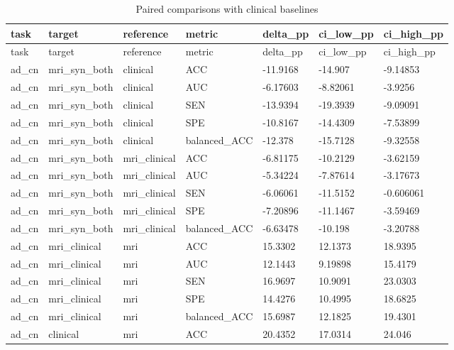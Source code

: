\begin{landscape}
\begingroup
\footnotesize
\setlength{\tabcolsep}{4pt}
\begin{longtable}{lllllll}
\caption{Paired comparisons with clinical baselines}\label{tab:classification_clinical_comparisons}\\
\toprule
task & target & reference & metric & delta\_pp & ci\_low\_pp & ci\_high\_pp \\
\midrule
\endfirsthead
\toprule
task & target & reference & metric & delta\_pp & ci\_low\_pp & ci\_high\_pp \\
\midrule
\endhead
\bottomrule
\endfoot
ad\_cn & mri\_syn\_both & clinical & ACC & -11.9168 & -14.907 & -9.14853 \\
ad\_cn & mri\_syn\_both & clinical & AUC & -6.17603 & -8.82061 & -3.9256 \\
ad\_cn & mri\_syn\_both & clinical & SEN & -13.9394 & -19.3939 & -9.09091 \\
ad\_cn & mri\_syn\_both & clinical & SPE & -10.8167 & -14.4309 & -7.53899 \\
ad\_cn & mri\_syn\_both & clinical & balanced\_ACC & -12.378 & -15.7128 & -9.32558 \\
ad\_cn & mri\_syn\_both & mri\_clinical & ACC & -6.81175 & -10.2129 & -3.62159 \\
ad\_cn & mri\_syn\_both & mri\_clinical & AUC & -5.34224 & -7.87614 & -3.17673 \\
ad\_cn & mri\_syn\_both & mri\_clinical & SEN & -6.06061 & -11.5152 & -0.606061 \\
ad\_cn & mri\_syn\_both & mri\_clinical & SPE & -7.20896 & -11.1467 & -3.59469 \\
ad\_cn & mri\_syn\_both & mri\_clinical & balanced\_ACC & -6.63478 & -10.198 & -3.20788 \\
ad\_cn & mri\_clinical & mri & ACC & 15.3302 & 12.1373 & 18.9395 \\
ad\_cn & mri\_clinical & mri & AUC & 12.1443 & 9.19898 & 15.4179 \\
ad\_cn & mri\_clinical & mri & SEN & 16.9697 & 10.9091 & 23.0303 \\
ad\_cn & mri\_clinical & mri & SPE & 14.4276 & 10.4995 & 18.6825 \\
ad\_cn & mri\_clinical & mri & balanced\_ACC & 15.6987 & 12.1825 & 19.4301 \\
ad\_cn & clinical & mri & ACC & 20.4352 & 17.0314 & 24.046 \\

\end{longtable}
\end{landscape}
